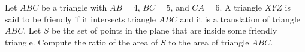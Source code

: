 Let $ABC$ be a triangle with $AB = 4$, $BC = 5$, and $CA = 6$. A triangle $XY Z$ is said to be friendly if it intersects triangle $ABC$ and it is a translation of triangle $ABC$. Let $S$ be the set of points in the plane that are inside some friendly triangle. Compute the ratio of the area of $S$ to the area of triangle $ABC$.
